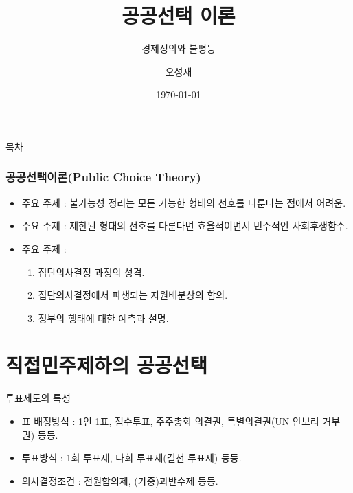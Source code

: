 \documentclass[aspectratio=169,xcolor=dvipsnames,handout]{beamer}
\title[공공선택 이론]{공공선택 이론} %
\subtitle{경제정의와 불평등}
\author[오성재]{오성재}
\institute[HNU] %
{
    한남대학교 \\
    탈메이지 교양학부 \\
}
\date{\today} %
\begin{document}
\begin{frame}
    \titlepage
\end{frame}

\begin{frame}{목차}
    \tableofcontents
\end{frame}


\begin{frame}[<+->]
\frametitle{공공선택이론(Public Choice Theory)}
    \begin{itemize}
       \item<1-> 주요 주제 :  불가능성 정리는 모든 가능한 형태의 선호를 다룬다는 점에서 어려움.
       \item<2-> 주요 주제 :  제한된 형태의 선호를 다룬다면 효율적이면서 민주적인 사회후생함수.
       \item<3-> 주요 주제 : 
       \begin{enumerate}
           \item<4> 집단의사결정 과정의 성격.
           \item<5> 집단의사결정에서 파생되는 자원배분상의 함의.
           \item<6> 정부의 행태에 대한 예측과 설명.
       \end{enumerate} 
   \end{itemize}
\end{frame}
\section{직접민주제하의 공공선택}

\begin{frame}{투표제도의 특성}
    \begin{itemize}[<+->]
        \item 표 배정방식 : 1인 1표, 점수투표, 주주총회 의결권, 특별의결권(UN 안보리 거부권) 등등.
        \item 투표방식 : 1회 투표제, 다회 투표제(결선 투표제) 등등.
        \item 의사결정조건 :  전원합의제, (가중)과반수제  등등.
    \end{itemize}
\end{frame}
\end{document}
